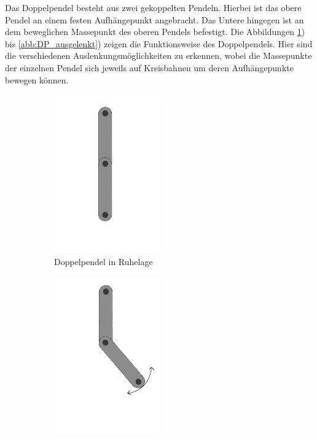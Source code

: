 \documentclass[11pt,a4paper,titlepage, ngerman]{article}
\begin{document}
			Das Doppelpendel besteht aus zwei gekoppelten Pendeln. Hierbei ist das obere Pendel an einem festen Aufhängepunkt angebracht. Das Untere  hingegen ist an dem beweglichen Massepunkt des oberen Pendels befestigt. Die Abbildungen \ref{abb:DP_Ruhe}) bis \ref{abb:DP_ausgelenkt}) zeigen die Funktionsweise des Doppelpendels. Hier sind die verschiedenen Auslenkungsmöglichkeiten zu erkennen, wobei die Massepunkte der einzelnen Pendel sich jeweils auf Kreisbahnen um deren Aufhängepunkte bewegen können.	
			\begin{figure}[ht]
				\begin{subfigure}{0.5\textwidth}
					\centering
					\includegraphics[width=0.5\textwidth]{Doppelpendel_Ruhelage.png}
					\caption{Doppelpendel in Ruhelage}
					\label{abb:DP_Ruhe}	
				\end{subfigure}
				\begin{subfigure}{0.5\textwidth}
					\centering
					\includegraphics[width=0.5\textwidth]{Doppelpendel_Auslenkung_P2.png}

\end{subfigure}
\end{figure}
\end{document}
